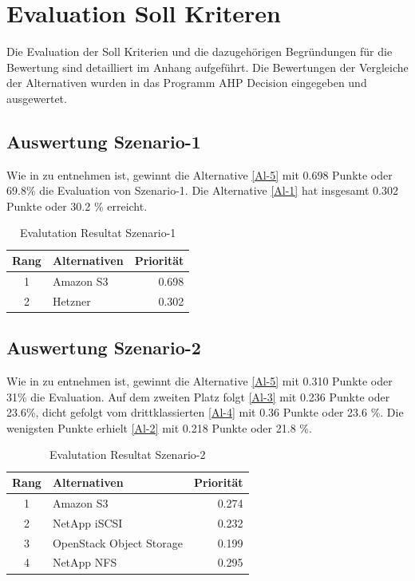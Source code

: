 \section{Evaluation Soll Kriteren}
Die Evaluation der Soll Kriterien und die dazugehörigen Begründungen für die Bewertung  sind detailliert im Anhang aufgeführt. Die Bewertungen der Vergleiche der Alternativen wurden in das Programm AHP Decision eingegeben und ausgewertet.

\subsection{Auswertung Szenario-1}

Wie in  zu entnehmen ist, gewinnt die Alternative  \ref{Al-5} mit 0.698 Punkte oder 69.8\% die Evaluation von Szenario-1. Die Alternative  \ref{Al-1} hat insgesamt 0.302 Punkte oder 30.2 \% erreicht.

\begin{table}[htbp]
\caption{Evalutation Resultat Szenario-1}
\begin{center}
\begin{tabular}{|c|l|r|}
\hline
Rang & Alternativen & \multicolumn{1}{l|}{Priorität} \\ \hline
1 & Amazon S3 & 0.698 \\ \hline
2 & Hetzner & 0.302 \\ \hline
\end{tabular}
\end{center}
\label{EvalResultS1}
\end{table}


\subsection{Auswertung Szenario-2}

Wie in  zu entnehmen ist, gewinnt die Alternative  \ref{Al-5} mit 0.310  Punkte oder 31\% die Evaluation. Auf dem zweiten Platz folgt  \ref{Al-3} mit 0.236 Punkte oder 23.6\%, dicht gefolgt vom drittklassierten  \ref{Al-4} mit 0.36 Punkte oder 23.6 \%. Die wenigsten Punkte erhielt  \ref{Al-2} mit 0.218 Punkte oder 21.8 \%.

\begin{table}[htbp]
\caption{Evalutation Resultat Szenario-2}
\begin{center}
\begin{tabular}{|c|l|r|}
\hline
Rang &Alternativen & \multicolumn{1}{l|}{Priorität} \\ \hline
1 & Amazon S3 & 0.274  \\ \hline
2 & NetApp iSCSI & 0.232 \\ \hline
3 & OpenStack Object Storage & 0.199 \\ \hline
4 & NetApp NFS & 0.295\\ \hline
\end{tabular}
\end{center}
\label{EvalResultS2}
\end{table}


